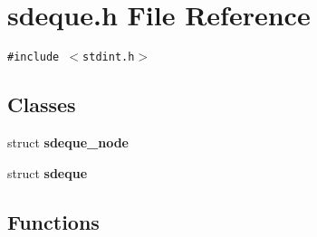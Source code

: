 \section{sdeque.h File Reference}
\label{sdeque_8h}
{\tt \#include $<$stdint.h$>$}\par
\subsection*{Classes}
\begin{CompactItemize}
\item 
struct {\bf sdeque\_\-node}
\item 
struct {\bf sdeque}
\end{CompactItemize}
\subsection*{Functions}

